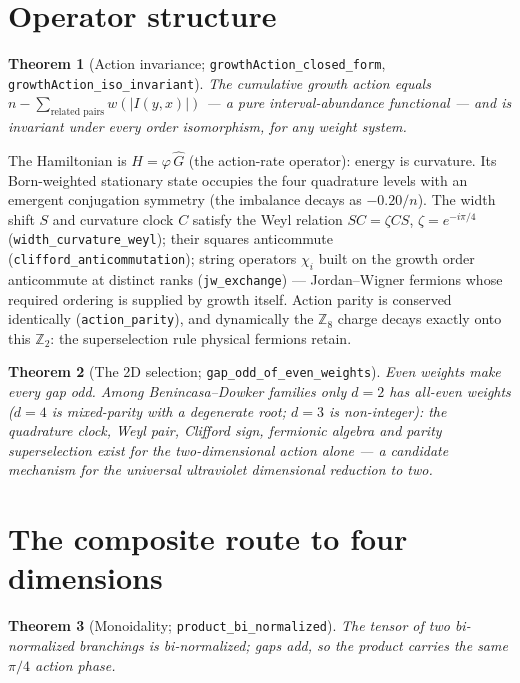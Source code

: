 \documentclass[11pt]{article}
\newtheorem{theorem}{Theorem}[section]
\newcommand{\Z}{\mathbb{Z}}
\begin{document}
\section{Operator structure}

\begin{theorem}[Action invariance;
\texttt{growthAction\_closed\_form},
\texttt{growthAction\_iso\_invariant}]
The cumulative growth action equals
$n-\sum_{\text{related pairs}}w(\lvert I(y,x)\rvert)$ --- a pure
interval-abundance functional --- and is invariant under every order
isomorphism, for any weight system.
\end{theorem}

The Hamiltonian is $H=\varphi\,\hat G$ (the action-rate operator):
energy is curvature.  Its Born-weighted stationary state occupies the
four quadrature levels with an emergent conjugation symmetry (the
imbalance decays as $-0.20/n$).  The width shift $S$ and curvature
clock $C$ satisfy the Weyl relation $SC=\zeta CS$,
$\zeta=e^{-i\pi/4}$ (\texttt{width\_curvature\_weyl}); their squares
anticommute (\texttt{clifford\_anticommutation}); string operators
$\chi_i$ built on the growth order anticommute at distinct ranks
(\texttt{jw\_exchange}) --- Jordan--Wigner fermions whose required
ordering is supplied by growth itself.  Action parity is conserved
identically (\texttt{action\_parity}), and dynamically the $\Z_8$
charge decays exactly onto this $\Z_2$: the superselection rule
physical fermions retain.

\begin{theorem}[The 2D selection; \texttt{gap\_odd\_of\_even\_weights}]
Even weights make every gap odd.  Among Benincasa--Dowker families
only $d=2$ has all-even weights ($d=4$ is mixed-parity with a
degenerate root; $d=3$ is non-integer): the quadrature clock, Weyl
pair, Clifford sign, fermionic algebra and parity superselection
exist for the two-dimensional action alone --- a candidate mechanism
for the universal ultraviolet dimensional reduction to two.
\end{theorem}

\section{The composite route to four dimensions}

\begin{theorem}[Monoidality; \texttt{product\_bi\_normalized}]
The tensor of two bi-normalized branchings is bi-normalized; gaps
add, so the product carries the same $\pi/4$ action phase.
\end{theorem}
\end{document}

